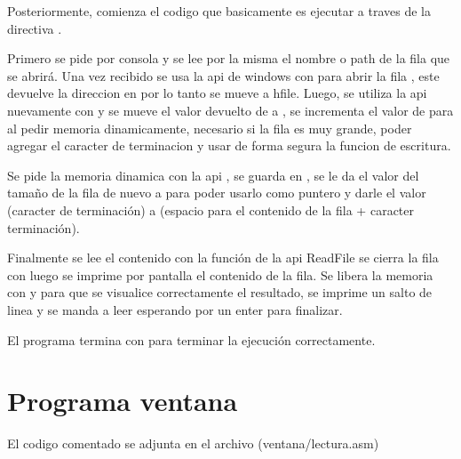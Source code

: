 \vspace{0.5cm}

Posteriormente, comienza el codigo que basicamente es ejecutar 
a traves de la directiva .


Primero se pide por consola y se lee por la misma el nombre o path de la fila
que se abrirá. Una vez recibido se usa la api de windows con  para
abrir la fila \Cite{MicrosoftCreateFileA}, este devuelve la direccion en 
por lo tanto se mueve a hfile. Luego, se utiliza la api nuevamente con 
\Cite{Windowsgetsize} y se mueve el valor devuelto de  a
, se incrementa el valor de  para al pedir
memoria dinamicamente, necesario si la fila es muy grande, poder agregar el
caracter de terminacion y usar de forma segura la funcion de escritura.


Se pide la memoria dinamica con la api  \Cite{GlobalAlloc},
se guarda en , se le da el valor del tamaño de la fila de nuevo a
 para poder usarlo como puntero y darle el valor 
(caracter de terminación) a  (espacio para el contenido de la
fila + caracter terminación).


Finalmente se lee el contenido con la función de la api ReadFile
\Cite{MicrosoftReadFile} se cierra la fila con 
\Cite{CloseHandle}
luego se imprime por pantalla el contenido de la fila. Se libera la memoria con
 y para que se visualice correctamente el resultado, se
imprime un salto de linea y se manda a leer esperando por un enter para finalizar.


El programa termina con  para terminar la ejecución
correctamente.





\section{Programa ventana}

El codigo comentado se adjunta en el archivo (ventana/lectura.asm)
